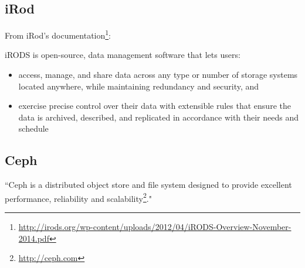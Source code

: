 \subsection{iRod}
From iRod's documentation\footnote{\url{http://irods.org/wp-content/uploads/2012/04/iRODS-Overview-November-2014.pdf}}:

iRODS is open-source, data management software that lets users:
\begin{itemize}
\item access, manage, and share data across any type or number of storage
systems located anywhere, while maintaining redundancy and security,
and
\item exercise precise control over their data with extensible rules that
ensure the data is archived, described, and replicated in accordance
with their needs and schedule
\end{itemize}

\subsection{Ceph}
``Ceph is a distributed object store and file system designed to provide excellent performance, 
reliability and scalability\footnote{\url{http://ceph.com}}."


\iffalse
\subsection{Concoord}
Describe why it is not suitable for us. It allows single object sharing.

\section{Distributed Workflows}
For our last section of this chapter we also need to define some parameters in the beginning:
\begin{itemize}
\item Deployment complexity
\item Data provision methods
\item State preservation
\item Centralization
\item Required user rights
\item Runtime control
\item Applicability
\end{itemize}

In this section we introduce a number of existing scientific workflow systems.
\subsection{COSMOS}\cite{Gafni30062014}
\subsection{Weaver}\cite{Bui_weaver:integrating}
\fi
